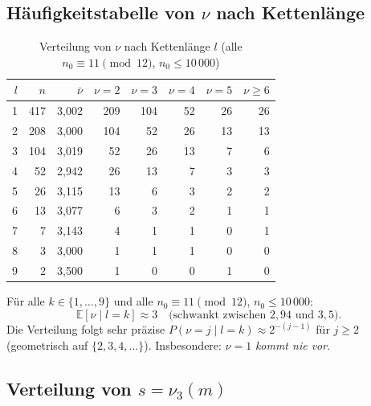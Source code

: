 \documentclass[12pt,a4paper]{article}
\newcommand{\viii}{\nu_3}
\newcommand{\E}{\mathbb{E}}
\begin{document}
\subsection{Häufigkeitstabelle von \texorpdfstring{$\nu$}{nu} nach Kettenlänge}

\begin{table}[h!]
\centering
\caption{Verteilung von $\nu$ nach Kettenlänge $l$ (alle $n_0 \equiv 11 \pmod{12}$, $n_0 \leq 10\,000$)}
\label{tab:nu_verteilung}
\renewcommand{\arraystretch}{1.3}
\begin{tabular}{r r r r r r r r}
\toprule
$l$ & $n$ & $\bar\nu$ & $\nu{=}2$ & $\nu{=}3$ & $\nu{=}4$ & $\nu{=}5$ & $\nu{\geq}6$ \\
\midrule
1 & 417 & 3,002 & 209 & 104 &  52 & 26 & 26 \\
2 & 208 & 3,000 & 104 &  52 &  26 & 13 & 13 \\
3 & 104 & 3,019 &  52 &  26 &  13 &  7 &  6 \\
4 &  52 & 2,942 &  26 &  13 &   7 &  3 &  3 \\
5 &  26 & 3,115 &  13 &   6 &   3 &  2 &  2 \\
6 &  13 & 3,077 &   6 &   3 &   2 &  1 &  1 \\
7 &   7 & 3,143 &   4 &   1 &   1 &  0 &  1 \\
8 &   3 & 3,000 &   1 &   1 &   1 &  0 &  0 \\
9 &   2 & 3,500 &   1 &   0 &   0 &  1 &  0 \\
\bottomrule
\end{tabular}
\end{table}

\begin{tcolorbox}[ergebnis, title={Numerisches Hauptergebnis: $\E[\nu \mid l{=}k] \approx 3$}]
Für alle $k \in \{1, \ldots, 9\}$ und alle $n_0 \equiv 11 \pmod{12}$,
$n_0 \leq 10\,000$:
\[
  \E[\nu \mid l{=}k] \approx 3 \quad \text{(schwankt zwischen } 2{,}94 \text{ und } 3{,}5\text{)}.
\]
Die Verteilung folgt sehr präzise $P(\nu{=}j \mid l{=}k) \approx 2^{-(j-1)}$
für $j \geq 2$ (geometrisch auf $\{2, 3, 4, \ldots\}$).
Insbesondere: $\nu = 1$ \emph{kommt nie vor}.
\end{tcolorbox}

\subsection{Verteilung von \texorpdfstring{$s = \viii(m)$}{s = nu3(m)}}
\end{document}
